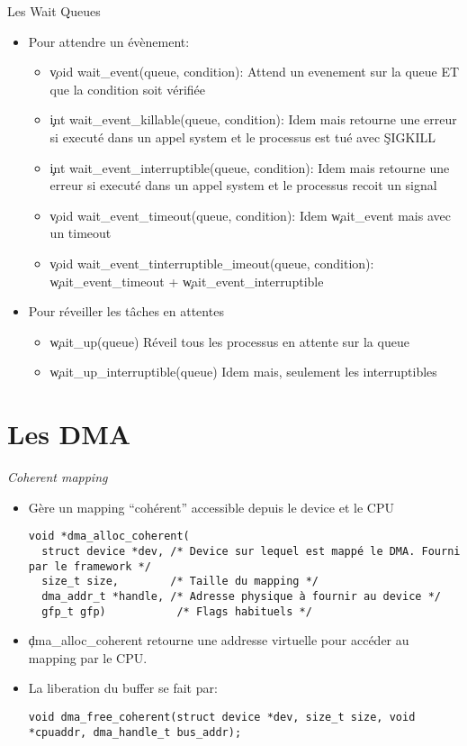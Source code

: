 \begin{frame}[fragile=singleslide]{Les Wait Queues}
  \begin{itemize} 
  \item Pour attendre un évènement:
    \begin{itemize} 
    \item \c{void wait_event(queue, condition)}: Attend un evenement sur
      la queue ET que la condition soit vérifiée
    \item  \c{int wait_event_killable(queue,  condition)}:  Idem  mais
      retourne  une  erreur  si  executé  dans un  appel  system  et  le
      processus est tué avec \c{SIGKILL}
    \item \c{int  wait_event_interruptible(queue, condition)}: Idem mais
      retourne  une  erreur  si  executé  dans un  appel  system  et  le
      processus recoit un signal
    \item   \c{void wait_event_timeout(queue, condition)}:   Idem
      \c{wait_event} mais avec un timeout
    \item  \c{void  wait_event_tinterruptible_imeout(queue, condition)}:
      \c{wait_event_timeout} + \c{wait_event_interruptible}
    \end{itemize} 
  \item Pour réveiller les tâches en attentes
    \begin{itemize} 
    \item \c{wait_up(queue)} Réveil tous les processus en attente sur la
      queue
    \item  \c{wait_up_interruptible(queue)}  Idem  mais,  seulement  les
      interruptibles
    \end{itemize}
  \end{itemize}  
\end{frame} 

\section{Les DMA}
 
\begin{frame}[fragile=singleslide]{\emph{Coherent mapping}}
  \begin{itemize}
  \item Gère un mapping ``cohérent'' accessible depuis le device et le
    CPU
    \begin{lstlisting} 
void *dma_alloc_coherent(
  struct device *dev, /* Device sur lequel est mappé le DMA. Fourni par le framework */
  size_t size,        /* Taille du mapping */
  dma_addr_t *handle, /* Adresse physique à fournir au device */
  gfp_t gfp)           /* Flags habituels */
    \end{lstlisting} 
  \item  \c{dma_alloc_coherent} retourne  une addresse  virtuelle pour
    accéder au mapping par le CPU.
  \item La liberation du buffer se fait par:
    \begin{lstlisting} 
void dma_free_coherent(struct device *dev, size_t size, void *cpuaddr, dma_handle_t bus_addr);
    \end{lstlisting} 
  \end{itemize} 
\end{frame} 

